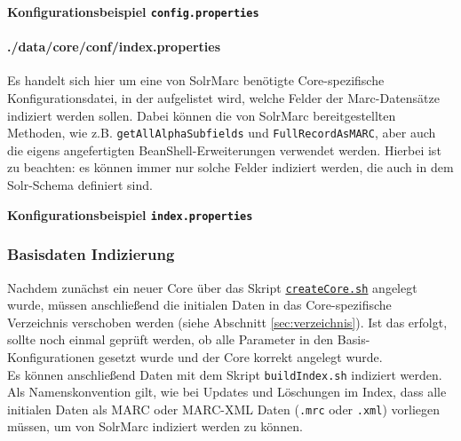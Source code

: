 \documentclass[10pt]{article}
\begin{document}
\textbf{Konfigurationsbeispiel \texttt{config.properties}} 


\paragraph{./data/core/conf/index.properties}
\label{para:index.properties}
Es handelt sich hier um eine von SolrMarc benötigte Core-spezifische Konfigurationsdatei, in der aufgelistet wird, welche Felder der Marc-Datensätze indiziert werden sollen. Dabei können die von SolrMarc bereitgestellten Methoden, wie z.B. \texttt{getAllAlphaSubfields} und \texttt{FullRecordAsMARC}, aber auch die eigens angefertigten BeanShell-Erweiterungen verwendet werden. Hierbei ist zu beachten: es können immer nur solche Felder indiziert werden, die auch in dem Solr-Schema definiert sind. 

\textbf{Konfigurationsbeispiel \texttt{index.properties}} 


\subsubsection{Basisdaten Indizierung}
\label{sec:subsub:Basis}
Nachdem zunächst ein neuer Core über das Skript \hyperref[sec:para:createCore]{\texttt{createCore.sh}} angelegt wurde, müssen anschließend die initialen Daten in das Core-spezifische Verzeichnis verschoben werden (siehe Abschnitt \ref{sec:verzeichnis}). Ist das erfolgt, sollte noch einmal geprüft werden, ob alle Parameter in den Basis-Konfigurationen gesetzt wurde und der Core korrekt angelegt wurde. \\
Es können anschließend Daten mit dem Skript \texttt{buildIndex.sh} indiziert werden. Als Namenskonvention gilt, wie bei Updates und Löschungen im Index, dass alle initialen Daten als MARC oder MARC-XML Daten (\texttt{.mrc} oder \texttt{.xml}) vorliegen müssen, um von SolrMarc indiziert werden zu können. 
\end{document}
